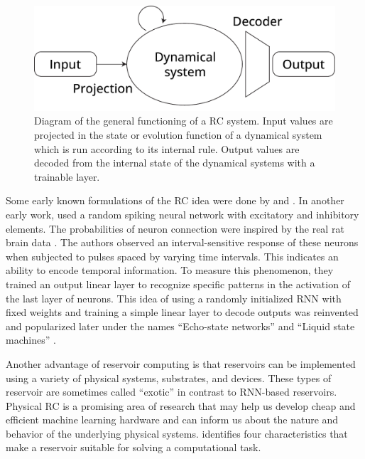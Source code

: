 \begin{figure}[htbp]
  \centering
  \includegraphics[width=.8\linewidth]{figures/reservoir_schema}
  \caption{Diagram of the general functioning of a \acf{RC} system. Input values
    are projected in the state or evolution function of a dynamical system which
    is run according to its internal rule. Output values are decoded from the
    internal state of the dynamical systems with a trainable layer.}
  \label{fig:reservoir_diagram}
\end{figure}

Some early known formulations of the \ac{RC} idea were done by
\textcite{kirbyContextDynamicsNeural1991} and
\textcite{schomakerNeuralNetworkModels1990,
  schomakerSimulationRecognitionHandwriting1991,
  schomakerNeuralOscillatornetworkModel1992}. In another early work,
\textcite{buonomanoTemporalInformationTransformed1995} used a random spiking
neural network with excitatory and inhibitory elements. The probabilities of neuron 
connection were inspired by the real rat brain data
\parencite{masonSynapticTransmissionIndividual1991}. The authors observed an interval-sensitive response of these neurons when subjected to pulses spaced by varying
time intervals. This indicates an ability to encode temporal information. To
measure this phenomenon, they trained an output linear layer to recognize specific
patterns in the activation of the last layer of neurons. This idea of using a
randomly initialized \ac{RNN} with fixed weights and training a simple linear layer
to decode outputs was reinvented and popularized later under the names
``Echo-state networks'' \parencite{jaegerEchoStateApproach2001} and ``Liquid
state machines'' \parencite{maassRealTimeComputingStable2002}.

Another advantage of reservoir computing is that reservoirs can be
implemented using a variety of physical systems, substrates, and devices. These
types of reservoir are sometimes called ``exotic''
\parencite{lukoseviciusReservoirComputingApproaches2009} in contrast to
\ac{RNN}-based reservoirs. Physical \ac{RC} is a promising area of research
that may help us develop cheap and efficient machine learning hardware and can
inform us about the nature and behavior of the underlying physical systems.
\textcite{tanakaRecentAdvancesPhysical2019} identifies four characteristics that
make a reservoir suitable for solving a computational task.

